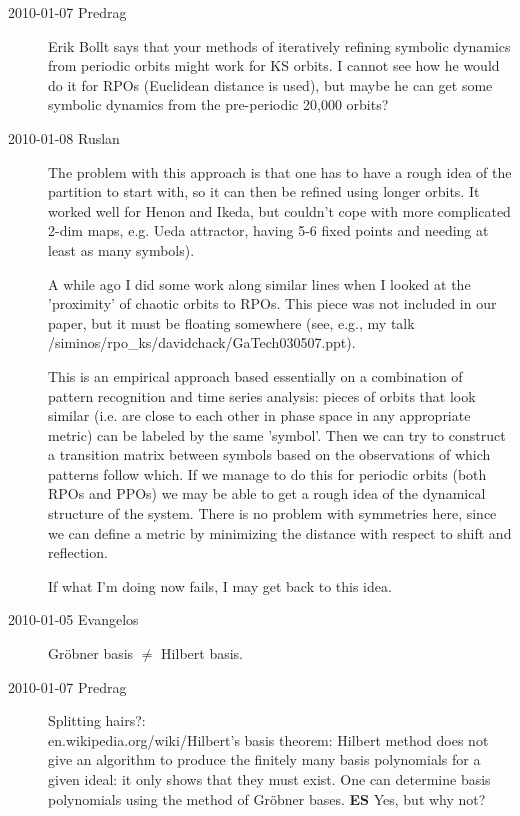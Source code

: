 \begin{description}
\item[2010-01-07 Predrag]
Erik Bollt says that your methods of iteratively refining
symbolic dynamics from periodic orbits might work for KS
orbits. I cannot see how he would do it for RPOs (Euclidean
distance is used), but maybe he can get some symbolic
dynamics from the pre-periodic 20,000 orbits?

\item[2010-01-08 Ruslan]
The problem with this approach is that one has to have a
rough idea of the partition to start with, so it can then be
refined using longer orbits.  It worked well for Henon and
Ikeda, but couldn't cope with more complicated 2-dim maps,
e.g. Ueda attractor, having 5-6 fixed points and needing at
least as many symbols).

A while ago I did some work along similar lines when I looked
at the 'proximity' of chaotic orbits to RPOs.  This piece was
not included in our paper, but it must be floating somewhere
(see, e.g., my talk
/siminos/rpo\_ks/davidchack/GaTech030507.ppt).

This is an empirical approach based essentially on a
combination of pattern recognition and time series analysis:
pieces of orbits that look similar (i.e. are close to each
other in phase space in any appropriate metric) can be
labeled by the same 'symbol'.  Then we can try to construct
a transition matrix between symbols based on the observations
of which patterns follow which.  If we manage to do this for
periodic orbits (both RPOs and PPOs) we may be able to get a
rough idea of the dynamical structure of the system.
There is no problem with symmetries here, since we can define
a metric by minimizing the distance with respect to shift and
reflection.

If what I'm doing now fails, I may get back to this idea.

\item[2010-01-05 Evangelos]
Gr\"obner basis $\neq$ Hilbert basis.

\item[2010-01-07 Predrag] Splitting hairs?:
\\\-
{en.wikipedia.org/wiki/Hilbert's basis theorem}:
Hilbert method does not give an algorithm
to produce the finitely many basis polynomials for a given
ideal: it only shows that they must exist. One can determine
basis polynomials using the method of Gr\"obner bases.
{\bf ES} Yes, but why not?



\end{description}
